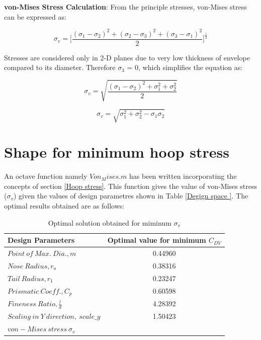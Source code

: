 \textbf{von-Mises Stress Calculation}: From the principle stresses, von-Mises stress can be expressed as:

\begin{equation}
\sigma _{v} = \Bigg[ \frac{(\sigma _{1}  - \sigma _{2})^2 + (\sigma _{2}  - \sigma _{3})^2 + (\sigma _{3}  - \sigma _{1})^2 }{2}   \Bigg]^{\frac{1}{2}}
\end{equation}

Stresses are considered only in 2-D planes due to very low thickness of envelope compared to its diameter. Therefore $ \sigma _{3} $ = 0, which simplifies the equation as:

\begin{equation}
\sigma _{v} = \sqrt{\frac{(\sigma _{1} - \sigma _{2})^{2} + \sigma _{1} ^{2} + \sigma _{2} ^{2}}{2}}
\end{equation}

\begin{equation}
\sigma _{v} = \sqrt{\sigma _{1} ^{2} + \sigma _{2} ^{2} - \sigma _{1} \sigma _{2}}
\end{equation}

\section{Shape for minimum hoop stress}
An octave function namely $ Von_Mises.m $ has been written incorporating the concepts of section \ref{Hoop stress}. This function gives the value of von-Mises stress ($ \sigma _{v} $) given the values of design parametres shown in Table \ref{Degign space }. The optimal results obtained are as follows:
\begin{table}[H]
	\centering
	\caption{Optimal solution obtained for miminum $ \sigma _{v} $}
	\label{Optimal solution obtained for mimimum sigma_v}
	\begin{tabular}{lc}
		\hline \hline
		Design Parameters & Optimal value for minimum $ C_{DV} $    \\ \hline \hline
		
		$ Point\ of\ Max.\ Dia., m$ & 0.44960      \\  
		$ Nose\ Radius, r _{o} $ & 0.38316    \\
		$ Tail\ Radius, r _{1} $ & 0.23247     \\  
		$ Prismatic\ Coeff., C _{p }$ & 0.60598 \\
		$ Fineness\ Ratio, \frac{l}{d} $ &4.28392 \\
		$Scaling\ in\ Y\ direction,\ scale\_y$ &1.50423 \\ \hline \hline
		
		$ von-Mises\ stress\  \sigma _{v}  $ & \\
		\hline \hline
	\end{tabular}
\end{table}


